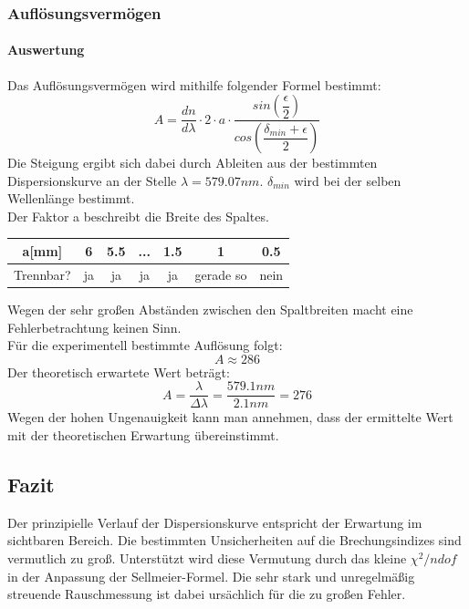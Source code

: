 \documentclass[12pt,a4paper]{article}
\begin{document}
\subsubsection{Auflösungsvermögen}
\paragraph{Auswertung}
Das Auflösungsvermögen wird mithilfe folgender Formel bestimmt:
\begin{equation}
A = \dfrac{dn}{d\lambda}\cdot 2\cdot a\cdot\dfrac{sin\left(\dfrac{\epsilon}{2}\right)}{cos\left(\dfrac{\delta_{min}+\epsilon}{2}\right)}
\end{equation}
Die Steigung ergibt sich dabei durch Ableiten aus der bestimmten Dispersionskurve an der Stelle $\lambda = 579.07 nm$. $\delta_{min}$ wird bei der selben Wellenlänge bestimmt.\\
Der Faktor a beschreibt die Breite des Spaltes.
\begin{table}
\begin{tabular}{|c|c|c|c|c|c|c|}
\hline
a[mm] & 6 & 5.5 & ... & 1.5 & 1 & 0.5\\
\hline
Trennbar? & ja & ja & ja & ja & gerade so & nein\\
\hline
\end{tabular}
\end{table}
Wegen der sehr großen Abständen zwischen den Spaltbreiten macht eine Fehlerbetrachtung keinen Sinn.\\
Für die experimentell bestimmte Auflösung folgt:
\begin{equation}
A \approx 286
\end{equation}
Der theoretisch erwartete Wert beträgt:
\begin{equation}
A = \dfrac{\lambda}{\Delta \lambda} = \dfrac{579.1 nm}{2.1 nm} = 276
\end{equation}
Wegen der hohen Ungenauigkeit kann man annehmen, dass der ermittelte Wert mit der theoretischen Erwartung übereinstimmt.


\subsection{Fazit}
Der prinzipielle Verlauf der Dispersionskurve entspricht der Erwartung im sichtbaren Bereich.
Die bestimmten Unsicherheiten auf die Brechungsindizes sind vermutlich zu groß. Unterstützt wird diese Vermutung durch das kleine $\chi^2/ndof$ in der Anpassung der Sellmeier-Formel.
Die sehr stark und unregelmäßig streuende Rauschmessung ist dabei ursächlich für die zu großen Fehler.
\end{document}
